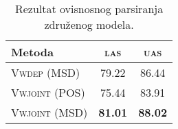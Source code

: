 \begin{table}
\centering
\caption{Rezultat ovisnosnog parsiranja združenog modela.}
\label{table:depparsing:joint}
\begin{tabular}{|l|c|c|}
\hline
Metoda                 & \textsc{las}   & \textsc{uas}    \\ \hline \hline
\textsc{Vwdep}   (MSD) & 79.22          & 86.44           \\
\textsc{Vwjoint} (POS) & 75.44          & 83.91           \\
\textsc{Vwjoint} (MSD) & \textbf{81.01} & \textbf{88.02}  \\ \hline
\end{tabular}
\end{table}
